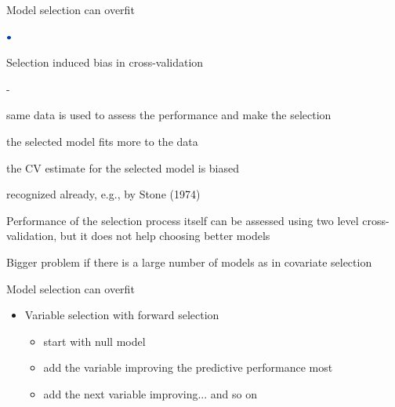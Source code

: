 \documentclass[english,t]{beamer}
\newenvironment{list1}{
   \begin{list}{$\color{list1}\bullet$}{\itemsep=6pt}}{
  \end{list}}
\newenvironment{list2}{
  \begin{list}{-}{\baselineskip=12pt\itemsep=2pt}}{
  \end{list}}
\begin{document}
\begin{frame}{Model selection can overfit}

  \begin{list1}
  \item Selection induced bias in cross-validation
    \begin{list2}
    \item same data is used to assess the performance and make the selection
    \item the selected model fits more to the data
    \item the CV estimate for the selected model is biased
    \item recognized already, e.g., by Stone (1974)
    \end{list2}
    \pause
  \item Performance of the selection process itself can be assessed
    using two level cross-validation, but it does not help choosing
    better models
    \pause
  \item Bigger problem if there is a large number of models as in
    covariate selection
  \end{list1}

\end{frame}

\begin{frame}{Model selection can overfit}

  \begin{itemize}
  \item Variable selection with forward selection
    \begin{itemize}
    \item start with null model
    \item add the variable improving the predictive performance most
    \item add the next variable improving... and so on
    \end{itemize}
  \end{itemize}

  
\end{frame}
\end{document}
